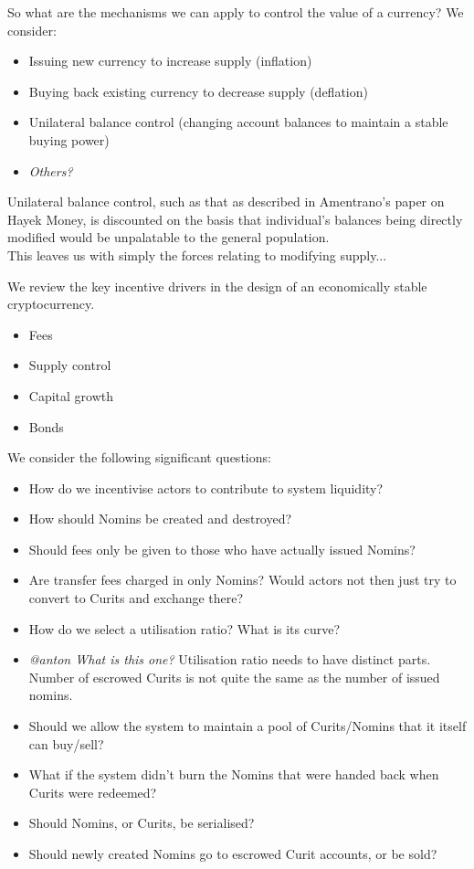 \noindent So what are the mechanisms we can apply to control the value of a currency? We consider:

\begin{itemize}
	\item Issuing new currency to increase supply (inflation)
	\item Buying back existing currency to decrease supply (deflation)
	\item Unilateral balance control (changing account balances to maintain a stable buying power)
	\item \textit{Others?}
\end{itemize}

\noindent Unilateral balance control, such as that as described in Amentrano's paper on Hayek Money, is discounted on the basis that individual's balances being directly modified would be unpalatable to the general population. \\

This leaves us with simply the forces relating to modifying supply...

We review the key incentive drivers in the design of an economically stable cryptocurrency. \\

\begin{itemize}
	\item Fees
	\item Supply control
	\item Capital growth
	\item Bonds
\end{itemize}

\noindent We consider the following significant questions:

\begin{itemize}
    \item How do we incentivise actors to contribute to system liquidity?
    \item How should Nomins be created and destroyed?
    \item Should fees only be given to those who have actually issued Nomins?
    \item Are transfer fees charged in only Nomins? Would actors not then just try to convert to Curits and exchange there?
    \item How do we select a utilisation ratio? What is its curve?
    \item \textit{@anton What is this one?} Utilisation ratio needs to have distinct parts. Number of escrowed Curits is not quite the same as the number of issued nomins.
    \item Should we allow the system to maintain a pool of Curits/Nomins that it itself can buy/sell?
    \item What if the system didn't burn the Nomins that were handed back when Curits were redeemed?
    \item Should Nomins, or Curits, be serialised?
    \item Should newly created Nomins go to escrowed Curit accounts, or be sold?
\end{itemize}

